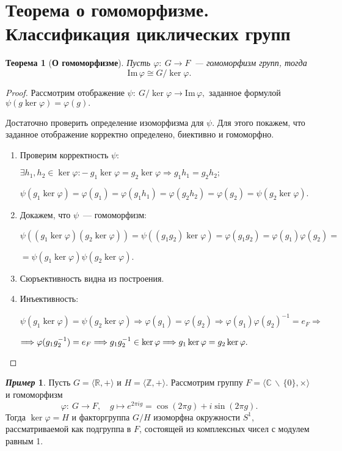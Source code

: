\documentclass[a4paper, 14pt]{extarticle}
\newcommand{\n}{\par}
\newcommand{\integers}{\mathbb{Z}}
\newcommand{\real}{\mathbb{R}}
\newcommand{\complex}{\mathbb{C}}
\newcommand{\suchthat}{{:}{-} \ }
\newcommand{\im}{\mathrm{Im} \,}
\renewcommand{\phi}{\varphi}
\theoremstyle{definition}
\newtheorem*{exmpl*}{\textit{Пример}}
\theoremstyle{plain}
\newtheorem*{theorem*}{Теорема}
\numberwithin{theorem}{section}
\numberwithin{definition}{section}
\numberwithin{statement}{section}
\numberwithin{lemma}{section}
\numberwithin{consequence}{section}
\begin{document}
	\section{Теорема о гомоморфизме. Классификация циклических групп}
		\begin{theorem*}[\textbf{О гомоморфизме}]
			Пусть ${\phi{:} \ G \rightarrow F}$~--- гомоморфизм групп, тогда
			\begin{equation*}
				\im \phi \cong G/ \ker \phi.
			\end{equation*}
		\end{theorem*}
		\begin{proof}
			Рассмотрим отображение ${\psi{:} \ G/ \ker \phi \rightarrow \im \phi,}$ заданное формулой ${\psi(g \ker \phi) = \phi(g).}$ \n
			Достаточно проверить определение изоморфизма для $\psi.$ Для этого покажем, что заданное отображение корректно определено, биективно и гомоморфно.
			\begin{enumerate}
				\setlength\itemsep{0.1em}
				\item Проверим корректность $\psi{:}$ \n
				$\exists h_1, h_2 \in \ker \phi \suchthat g_1 \ker \phi = g_2 \ker \phi \Longrightarrow g_1 h_1 = g_2 h_2;$ \n
				$\psi(g_1 \ker \phi) = \phi(g_1) = \phi(g_1 h_1) = \phi(g_2 h_2) = \phi(g_2) = \psi(g_2 \ker \phi).$
				\item Докажем, что $\psi$~--- гомоморфизм: \n
				${\psi((g_1 \ker \phi)(g_2 \ker \phi)) = \psi ((g_1g_2) \ker \phi) = \phi(g_1 g_2) = \phi(g_1) \phi(g_2) =}$ \n
				${=\psi(g_1 \ker \phi) \psi(g_2 \ker \phi).}$
				\item Сюръективность видна из построения.
				\item Инъективность: \n
				${\psi(g_1 \ker \phi) = \psi(g_2 \ker \phi) \Longrightarrow \phi(g_1) = \phi(g_2) \Longrightarrow \phi(g_1) \phi(g_2)^{-1} = e_F \Longrightarrow}$ \n $\Longrightarrow \phi(g_1g_2^{-1}) = e_F \Longrightarrow g_1g_2^{-1} \in \ker \phi \Longrightarrow g_1 \ker \phi = g_2 \ker \phi. \qedhere$
			\end{enumerate} 
		\end{proof}
		\begin{exmpl*}
			Пусть ${G = \langle \real, + \rangle}$ и ${H = \langle \integers, + \rangle}$. Рассмотрим группу ${F = \langle \complex \, \backslash \, \{0\}, \times \rangle}$ и гомоморфизм
			\begin{equation*}
				\phi{:} \ G \rightarrow F, \quad g \mapsto e^{2\pi i g} = \cos(2\pi g) + i \sin(2\pi g).
			\end{equation*}
			Тогда ${\ker \phi = H}$ и факторгруппа $G/H$ изоморфна окружности $S^1$, рассматриваемой как подгруппа в $F$, состоящей из комплексных чисел с модулем равным 1.
		\end{exmpl*}
\end{document}

